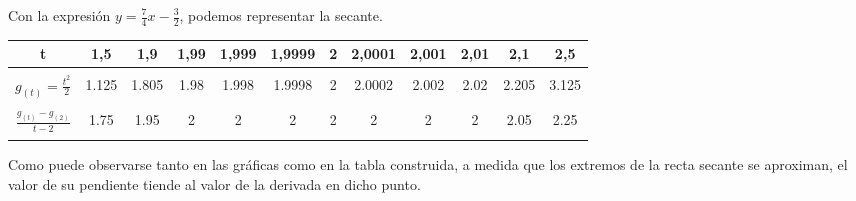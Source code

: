 Con la expresión $y = \frac{7}{4}x - \frac{3}{2}$, podemos representar la secante.

\begin{center}
\end{center}

\begin{center}
\begin{tabular}{ c c c c c c c c c c c c }
    t & 1,5 & 1,9 & 1,99 & 1,999 & 1,9999 & 2 & 2,0001 & 2,001 & 2,01 & 2,1 & 2,5\\
	\hline \\
    $g_{(t)} = \frac{t^2}{2}$ & 1.125 & 1.805 & 1.98 & 1.998 & 1.9998 & 2 & 2.0002 & 2.002 & 2.02 & 2.205 & 3.125 \\
    \vspace{10pt} \\
    $\frac{g_(t) - g_(2)}{t - 2}$ & 1.75 & 1.95 & 2 & 2 & 2 & 2 & 2 & 2 & 2 & 2.05 & 2.25\\
    \vspace{10pt} \\
    \hline
\end{tabular}
\end{center}

Como puede observarse tanto en las gráficas como en la tabla construida, a medida que los extremos de la recta secante se aproximan, el valor de su pendiente tiende al valor de la derivada en dicho punto.
